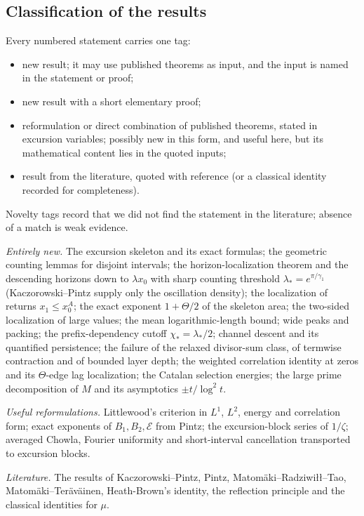\documentclass[11pt]{amsart}
\numberwithin{equation}{section}
\theoremstyle{plain}
\theoremstyle{definition}
\theoremstyle{remark}
\newcommand{\En}{\mathcal{E}}
\begin{document}
\subsection{Classification of the results}
\label{subsec:classification}
Every numbered statement carries one tag:
\begin{itemize}[leftmargin=2.5em]
\item[\textup{[N]}] new result; it may use published theorems as input, and
the input is named in the statement or proof;
\item[\textup{[N-el]}] new result with a short elementary proof;
\item[\textup{[C]}] reformulation or direct combination of published
theorems, stated in excursion variables; possibly new in this form, and useful
here, but its mathematical content lies in the quoted inputs;
\item[\textup{[L]}] result from the literature, quoted with reference (or a
classical identity recorded for completeness).
\end{itemize}
Novelty tags record that we did not find the statement in the literature;
absence of a match is weak evidence.

\smallskip\noindent\emph{Entirely new.} The excursion skeleton and its exact
formulas; the geometric counting lemmas for disjoint intervals; the
horizon-localization theorem and the descending horizons down to $\lambda x_0$
with sharp counting threshold $\lambda_*=e^{\pi/\gamma_1}$
(Kaczorowski--Pintz supply only the oscillation density); the localization
of returns $x_1\le x_0^A$; the exact exponent $1+\Theta/2$ of the skeleton
area; the two-sided localization of large values; the mean
logarithmic-length bound; wide peaks and packing; the prefix-dependency cutoff
$\chi_*=\lambda_*/2$; channel descent and its quantified persistence; the
failure of the relaxed divisor-sum class, of termwise contraction and of
bounded layer depth; the weighted correlation identity at zeros and its
$\Theta$-edge lag localization; the Catalan selection energies; the large
prime decomposition of $M$ and its asymptotics $\pm t/\log^2t$.

\smallskip\noindent\emph{Useful reformulations.} Littlewood's criterion in
$L^1$, $L^2$, energy and correlation form; exact exponents of $B_1,B_2,\En$
from Pintz; the excursion-block series of $1/\zeta$; averaged Chowla,
Fourier uniformity and short-interval cancellation transported to excursion
blocks.

\smallskip\noindent\emph{Literature.} The results of
Kaczorowski--Pintz, Pintz, Matomäki--Radziwiłł--Tao, Matomäki--Teräväinen,
Heath-Brown's identity, the reflection principle and the classical
identities for $\mu$.
\end{document}

